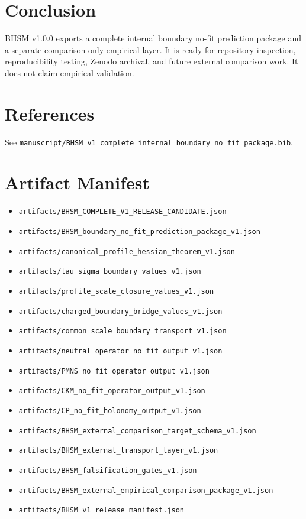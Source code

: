 \documentclass[11pt]{article}
\begin{document}
\section{Conclusion}
BHSM v1.0.0 exports a complete internal boundary no-fit prediction package and a separate comparison-only empirical layer. It is ready for repository inspection, reproducibility testing, Zenodo archival, and future external comparison work. It does not claim empirical validation.

\section*{References}
See \texttt{manuscript/BHSM\_v1\_complete\_internal\_boundary\_no\_fit\_package.bib}.

\appendix
\section{Artifact Manifest}
\begin{itemize}[leftmargin=*]
\item \texttt{artifacts/BHSM\_COMPLETE\_V1\_RELEASE\_CANDIDATE.json}
\item \texttt{artifacts/BHSM\_boundary\_no\_fit\_prediction\_package\_v1.json}
\item \texttt{artifacts/canonical\_profile\_hessian\_theorem\_v1.json}
\item \texttt{artifacts/tau\_sigma\_boundary\_values\_v1.json}
\item \texttt{artifacts/profile\_scale\_closure\_values\_v1.json}
\item \texttt{artifacts/charged\_boundary\_bridge\_values\_v1.json}
\item \texttt{artifacts/common\_scale\_boundary\_transport\_v1.json}
\item \texttt{artifacts/neutral\_operator\_no\_fit\_output\_v1.json}
\item \texttt{artifacts/PMNS\_no\_fit\_operator\_output\_v1.json}
\item \texttt{artifacts/CKM\_no\_fit\_operator\_output\_v1.json}
\item \texttt{artifacts/CP\_no\_fit\_holonomy\_output\_v1.json}
\item \texttt{artifacts/BHSM\_external\_comparison\_target\_schema\_v1.json}
\item \texttt{artifacts/BHSM\_external\_transport\_layer\_v1.json}
\item \texttt{artifacts/BHSM\_falsification\_gates\_v1.json}
\item \texttt{artifacts/BHSM\_external\_empirical\_comparison\_package\_v1.json}
\item \texttt{artifacts/BHSM\_v1\_release\_manifest.json}
\end{itemize}
\end{document}
